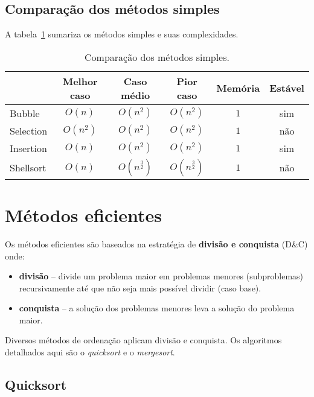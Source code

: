 \subsection{Comparação dos métodos simples}

A tabela~\ref{aula03:tab:caso01} sumariza os métodos simples e suas complexidades.
%
\begin{table}[!ht]
\centering
\begin{tabular}{lccccc}
\hline
          & Melhor caso & Caso médio & Pior caso & Memória & Estável \\ \hline
Bubble    & $O(n)$ & $O(n^2)$ & $O(n^2)$ & $1$ & sim \\ \hline
Selection & $O(n^2)$ & $O(n^2)$ & $O(n^2)$ & $1$ & não  \\ \hline
Insertion & $O(n)$ & $O(n^2)$ & $O(n^2)$ & $1$ &  sim \\ \hline
Shellsort & $O(n)$ & $O(n^{\frac{3}{2}})$ & $O(n^{\frac{3}{2}})$ &  $1$ & não \\ \hline
\end{tabular}
\caption{Comparação dos métodos simples.}
\label{aula03:tab:caso01}
\end{table}

\section{Métodos eficientes}

Os métodos eficientes são baseados na estratégia de {\bf divisão e conquista} (D\&C)
onde:
\begin{itemize}
\item {\bf divisão} -- divide um problema maior em problemas menores (subproblemas) 
recursivamente até que não seja mais possível dividir (caso base).

\item {\bf conquista} -- a solução dos problemas menores leva a solução do problema maior.
\end{itemize}

Diversos métodos de ordenação aplicam divisão e conquista. Os algoritmos detalhados
aqui são o \emph{quicksort} e o \emph{mergesort}.

\subsection{Quicksort}

